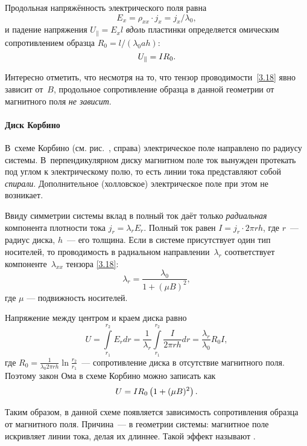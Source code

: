 Продольная напряжённость электрического поля равна
\[E_x = \rho_{xx}\cdot j_x = j_x/\lambda_0,\]
и падение напряжения $U_{\parallel}=E_x l$ \emph{вдоль} пластинки 
определяется омическим сопротивлением образца 
 $R_0 = l/(\lambda_0ah)$:
\begin{equation}
    U_{\parallel}= I R_0.
    \eqmark{3.20}
\end{equation}

Интересно отметить, что несмотря на то, что тензор проводимости~\eqref{3.18}
явно зависит от~$B$, продольное сопротивление образца 
в данной геометрии от магнитного поля \emph{не зависит}.

\paragraph{Диск Корбино}
В~схеме Корбино (см. рис.~, справа) электрическое поле
направлено по радиусу системы. В~перпендикулярном диску магнитном поле ток
вынужден протекать под углом к электрическому полю, то есть линии тока
представляют собой \emph{спирали}. Дополнительное (холловское) электрическое
поле при этом не возникает.

Ввиду симметрии системы вклад в полный ток даёт только \emph{радиальная}
компонента плотности тока $j_r=\lambda_{r} E_r$. Полный ток равен
$I=j_r \cdot 2\pi r h$, где $r$~--- радиус диска, $h$~--- его толщина.
Если в системе присутствует один тип носителей, то проводимость в радиальном
направлении~$\lambda_r$ соответствует компоненте~$\lambda_{xx}$ тензора
\eqref{3.18}:
\begin{equation}
\lambda_r = \frac{\lambda_0}{1+(\mu B)^2},
\end{equation}
где $\mu$ --- подвижность носителей.

Напряжение между центром и краем диска равно
\begin{equation*}
U=\int\limits_{r_1}^{r_2}E_r dr=
\frac{1}{\lambda_r}\int\limits_{r_1}^{r_2} \frac{I}{2\pi r h}dr =
\frac{\lambda_r}{\lambda_0}R_0 I,
\end{equation*}
где $R_0 = \frac{1}{\lambda_0 2\pi r h} \ln \frac{r_2}{r_1}$~---
сопротивление диска в отсутствие магнитного поля. Поэтому закон Ома
в схеме Корбино можно записать как
\begin{equation}
    \eqmark{MagnetoSoprot}
    U=I R_0 \left(1+(\mu B)^2 \right).
\end{equation}

Таким образом, в данной схеме появляется зависимость сопротивления
образца от магнитного поля. Причина~--- в геометрии системы: 
магнитное поле искривляет линии тока, делая их длиннее. 
Такой эффект называют .

